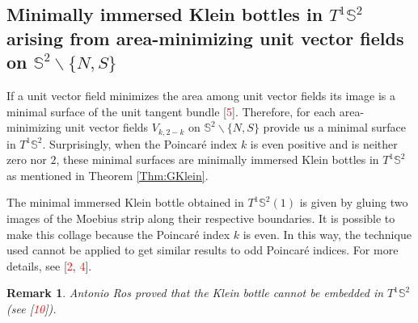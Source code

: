 \documentclass[reqno,11pt]{amsart}
\newtheorem*{remark*}{Remark}
\begin{document}



\subsection{Minimally immersed Klein bottles in $T^1\mathbb{S}^2$ arising from area-minimizing unit vector fields on $\mathbb{S}^2\backslash \{N,S \}$} \label{GK}

If a unit vector field minimizes the area  among unit vector fields its image is a minimal surface of the unit tangent bundle [\textcolor{red}{5}]. 
Therefore, for each area-minimizing unit vector fields $V_{k, 2-k}$ on $\mathbb{S}^2\backslash\{N,S\}$ %
provide us a minimal surface in $T^1\mathbb{S}^2$. Surprisingly, when the Poincaré index $k$ is even positive and is neither zero nor $2$, these minimal surfaces are minimally immersed Klein bottles in $T^1\mathbb{S}^2$ as mentioned in Theorem \ref{Thm:GKlein}.

The minimal immersed Klein bottle obtained in $T^1\mathbb{S}^2(1)$ is given by gluing two images of the Moebius strip along their respective boundaries. It is possible to make this collage because the Poincaré index $k$ is even. In this way, the technique used cannot be applied to get similar results to odd Poincaré indices. For more details, see [\textcolor{red}{2}, \textcolor{red}{4}].




\begin{remark*}
    Antonio Ros proved that the Klein bottle cannot be embedded in $T^1\mathbb{S}^2$ (see [\textcolor{red}{10}]). 
\end{remark*}
\end{document}
